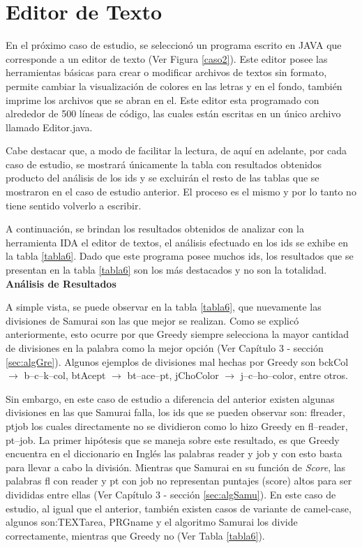 \section{Editor de Texto}

En el próximo caso de estudio, se seleccionó un programa escrito en JAVA que corresponde a un editor de texto (Ver Figura \ref{caso2}). Este editor posee las herramientas básicas para crear o modificar archivos de textos sin formato, permite cambiar la visualización de colores en las letras y en el fondo, también imprime los archivos que se abran en el.
Este editor esta programado con alrededor de 500 líneas de código, las cuales están escritas en un único archivo llamado Editor.java. 

Cabe destacar que, a modo de facilitar la lectura, de aquí en adelante, por cada caso de estudio, se mostrará únicamente la tabla con resultados obtenidos producto del análisis de los ids y se excluirán el resto de las tablas que se mostraron en el caso de estudio anterior. El proceso es el mismo y por lo tanto no tiene sentido volverlo a escribir.

A continuación, se brindan los resultados obtenidos de analizar con la herramienta IDA el editor de textos, el análisis efectuado en los ids se exhibe en la tabla \ref{tabla6}. Dado que este programa posee muchos ids, los resultados que se presentan en la tabla \ref{tabla6} son los más destacados y no son la totalidad.\\

\noindent \textbf{Análisis de Resultados\\}

A simple vista, se puede observar en la tabla \ref{tabla6}, que nuevamente las divisiones de Samurai son las que mejor se realizan.
Como se explicó anteriormente, esto ocurre por que Greedy siempre selecciona la mayor cantidad de divisiones en la palabra como la mejor opción (Ver Capítulo 3 - sección \ref{sec:algGre}). Algunos ejemplos de divisiones mal hechas por Greedy son \textsf{bckCol} $\rightarrow$ \textsf{b--c--k--col},
\textsf{btAcept} $\rightarrow$ \textsf{bt--ace--pt}, \textsf{jChoColor} $\rightarrow$ \textsf{j--c--ho--color}, entre otros. 

Sin embargo, en este caso de estudio a diferencia del anterior existen algunas divisiones en las que Samurai falla, los ids que se pueden observar son: \textsf{flreader}, \textsf{ptjob} los cuales directamente no se dividieron como lo hizo Greedy en \mbox{\textsf{fl--reader}}, \textsf{pt--job}. La primer hipótesis que se maneja sobre este resultado, es que Greedy encuentra en el diccionario en Inglés las palabras \textsf{reader} y \textsf{job} y con esto basta para llevar a cabo la división. Mientras que Samurai en su función de \textit{Score}, las palabras \textsf{fl} con \textsf{reader} y \textsf{pt} con \textsf{job} no representan puntajes (score) altos para ser divididas entre ellas (Ver Capítulo 3 - sección \ref{sec:algSamu}). En este caso de estudio, al igual que el anterior, también existen casos de variante de camel-case, algunos son:\textsf{TEXTarea}, \textsf{PRGname} y el algoritmo Samurai los divide correctamente, mientras que Greedy no (Ver Tabla \ref{tabla6}).

